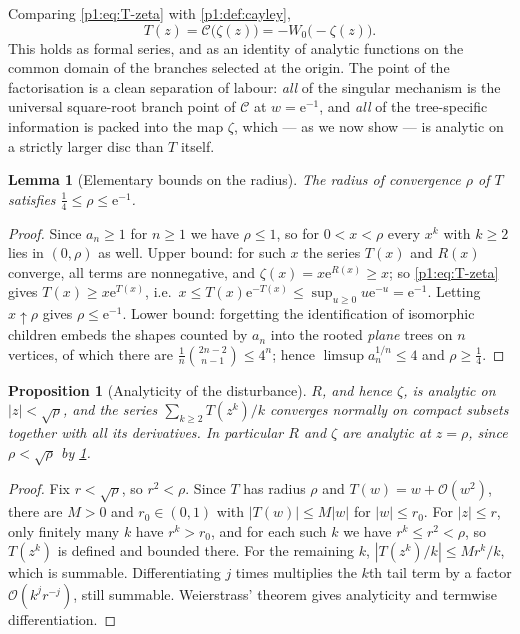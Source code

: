 \documentclass[11pt,a4paper,oneside]{book}
\theoremstyle{plain}
\newtheorem{proposition}[theorem]{Proposition}
\newtheorem{lemma}[theorem]{Lemma}
\theoremstyle{definition}
\theoremstyle{remark}
\newcommand{\e}{\mathrm{e}}
\newcommand{\bigO}{\mathcal{O}}
\newcommand{\Wlam}{W}
\begin{document}
Comparing \cref{p1:eq:T-zeta} with \cref{p1:def:cayley},
\begin{equation}
 \boxed{\;T(z)=\mathcal C\bigl(\zeta(z)\bigr)
 =-\Wlam_0\bigl(-\zeta(z)\bigr).\;}
 \label{p1:eq:factorisation}
\end{equation}
This holds as formal series, and as an identity of analytic functions on the common domain of
the branches selected at the origin.  The point of the factorisation is a clean separation of
labour: \emph{all} of the singular mechanism is the universal square-root branch point of
$\mathcal C$ at $w=\e^{-1}$, and \emph{all} of the tree-specific information is packed into
the map $\zeta$, which --- as we now show --- is analytic on a strictly larger disc than $T$
itself.

\begin{lemma}[Elementary bounds on the radius]
\label{p1:lem:radius-bounds}
The radius of convergence $\rho$ of $T$ satisfies $\tfrac14\le\rho\le\e^{-1}$.
\end{lemma}

\begin{proof}
Since $a_n\ge1$ for $n\ge1$ we have $\rho\le1$, so for $0<x<\rho$ every $x^{k}$ with $k\ge2$
lies in $(0,\rho)$ as well.  Upper bound: for such $x$ the series $T(x)$ and $R(x)$ converge,
all terms are nonnegative, and $\zeta(x)=x\e^{R(x)}\ge x$; so \cref{p1:eq:T-zeta} gives
$T(x)\ge x\e^{T(x)}$, i.e.\ $x\le T(x)\e^{-T(x)}\le\sup_{u\ge0}u\e^{-u}=\e^{-1}$.  Letting
$x\uparrow\rho$ gives $\rho\le\e^{-1}$.  Lower bound: forgetting the identification of
isomorphic children embeds the shapes counted by $a_n$ into the rooted \emph{plane} trees on
$n$ vertices, of which there are $\frac1n\binom{2n-2}{n-1}\le4^{n}$; hence $\limsup
a_n^{1/n}\le4$ and $\rho\ge\tfrac14$.
\end{proof}

\begin{proposition}[Analyticity of the disturbance]
\label{p1:prop:R-analytic}
$R$, and hence $\zeta$, is analytic on $|z|<\sqrt\rho$, and the series $\sum_{k\ge2}T(z^k)/k$
converges normally on compact subsets together with all its derivatives.  In particular $R$
and $\zeta$ are analytic at $z=\rho$, since $\rho<\sqrt\rho$ by \cref{p1:lem:radius-bounds}.
\end{proposition}

\begin{proof}
Fix $r<\sqrt\rho$, so $r^2<\rho$.  Since $T$ has radius $\rho$ and $T(w)=w+\bigO(w^2)$, there
are $M>0$ and $r_0\in(0,1)$ with $|T(w)|\le M|w|$ for $|w|\le r_0$.  For $|z|\le r$, only
finitely many $k$ have $r^k>r_0$, and for each such $k$ we have $r^k\le r^2<\rho$, so $T(z^k)$
is defined and bounded there.  For the remaining $k$, $|T(z^k)/k|\le Mr^k/k$, which is
summable. Differentiating $j$ times multiplies the $k$th tail term by a factor $\bigO(k^j
r^{-j})$, still summable.  Weierstrass' theorem gives analyticity and termwise
differentiation.
\end{proof}
\end{document}
